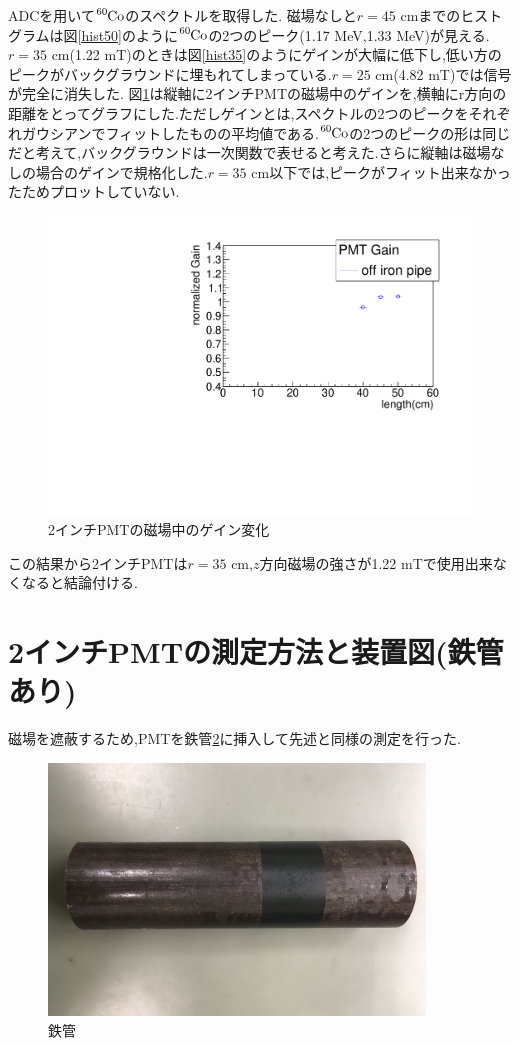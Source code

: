 ADCを用いて$\ce{^{60}Co}$のスペクトルを取得した.
磁場なしと$r=45$ cmまでのヒストグラムは図\ref{hist50}のように$\ce{^{60}Co}$の2つのピーク(1.17 MeV,1.33 MeV)が見える.
$r=35$ cm(1.22 mT)のときは図\ref{hist35}のようにゲインが大幅に低下し,低い方のピークがバックグラウンドに埋もれてしまっている.$r=25$ cm(4.82 mT)では信号が完全に消失した.
図\ref{plot2inchoff}は縦軸に2インチPMTの磁場中のゲインを,横軸にr方向の距離をとってグラフにした.ただしゲインとは,スペクトルの2つのピークをそれぞれガウシアンでフィットしたものの平均値である.$\ce{^{60}Co}$の2つのピークの形は同じだと考えて,バックグラウンドは一次関数で表せると考えた.さらに縦軸は磁場なしの場合のゲインで規格化した.$r=35$ cm以下では,ピークがフィット出来なかったためプロットしていない.

\begin{figure}[t]
	\centering
		\includegraphics[angle=-90,width=15cm]{fig/iguchi/plot2inchPMT.pdf}
	\caption{2インチPMTの磁場中のゲイン変化}
	\label{plot2inchoff}
\end{figure}
この結果から2インチPMTは$r=35$ cm,$z$方向磁場の強さが1.22 mTで使用出来なくなると結論付ける.

\section{2インチPMTの測定方法と装置図(鉄管あり)}
磁場を遮蔽するため,PMTを鉄管\ref{ironpipe}に挿入して先述と同様の測定を行った.
\begin{figure}[h]
	\centering
		\includegraphics[width=10cm]{fig/iguchi/ironpipe.JPG}
	\caption{鉄管}
	\label{ironpipe}
\end{figure}

